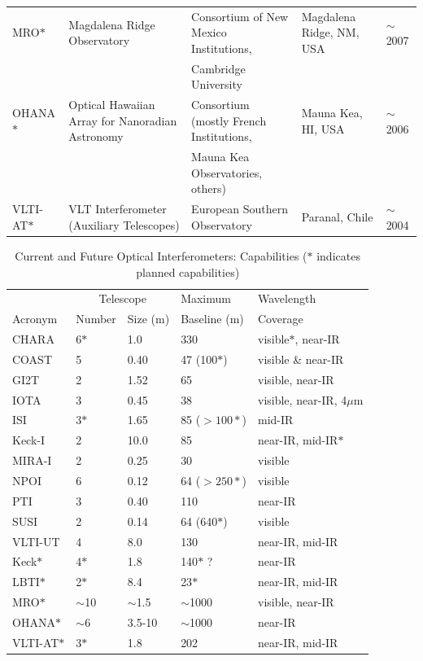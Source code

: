 \documentclass[12pt]{article}
\begin{document}
\begin{landscape}
\begin{table}
\begin{center}
\begin{tabular}{|l|l|l|l|l|}
MRO$\ast$ & Magdalena Ridge Observatory & Consortium of New Mexico Institutions, & Magdalena Ridge, NM, USA &
$\sim$2007 \\
&& Cambridge University & &\\
OHANA$\ast$ & Optical Hawaiian Array for Nanoradian Astronomy & Consortium (mostly French Institutions, &
Mauna Kea, HI, USA & $\sim$2006 \\
&& Mauna Kea Observatories, others) && \\
VLTI-AT$\ast$ & VLT Interferometer (Auxiliary Telescopes) & 
European Southern Observatory & Paranal, Chile & $\sim$2004 \\
\hline
\end{tabular}
\end{center}

\end{table}
\end{landscape}


\begin{table}
\footnotesize
\caption {Current and Future Optical Interferometers: Capabilities
($\ast$ indicates planned capabilities)
\label{table:capabilities}}
\begin{center}
\begin{tabular}{|l|l|l|l|l|}
\hline
\footnotesize
        &            \multicolumn{2}{|c|}{Telescope} & Maximum & Wavelength  \\
Acronym &  Number & Size (m) & Baseline (m) & Coverage \\ 
\hline
CHARA &  6$\ast$ & 1.0 & 330 & visible$\ast$,
near-IR \\
COAST &  5 & 0.40 & 47 (100$\ast$) & visible \& near-IR \\
GI2T &  2 & 1.52 & 65 & visible, near-IR \\
IOTA &  3 & 0.45 & 38 & visible, near-IR, 4$\mu$m \\
ISI &  3$\ast$ & 1.65 & 85 ($>100 \ast$) & mid-IR \\
Keck-I &  2 & 10.0 & 85 & near-IR, mid-IR$\ast$ \\
MIRA-I &  2 & 0.25 & 30 & visible \\
NPOI &  6 & 0.12 & 64 ($>250\ast$) & visible\\
PTI &  3 & 0.40 & 110 & near-IR \\
SUSI &  2 & 0.14 & 64 (640$\ast$) & visible \\
VLTI-UT &  4 & 8.0 & 130& near-IR, mid-IR \\
\hline
Keck$\ast$ &  4$\ast$ & 1.8 & 140$\ast$ ? & near-IR \\
LBTI$\ast$ &  2$\ast$ & 8.4 & 23$\ast$ & near-IR, mid-IR \\
MRO$\ast$ &  $\sim$10 & $\sim$1.5 & $\sim$1000 & visible, near-IR \\
OHANA$\ast$ & $\sim$6 & 3.5-10 & $\sim$1000 & near-IR \\
VLTI-AT$\ast$ &  3$\ast$ & 1.8 & 202 & near-IR, mid-IR \\
\hline
\end{tabular}
\end{center}
\end{table}
\end{document}
